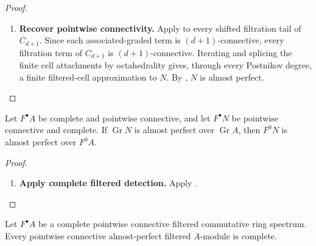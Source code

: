 \begin{proof}
\begin{enumerate}[label=\textup{(\arabic*)}]
\[        F^{w_i}C_d
        \longrightarrow
        \operatorname{Gr}^{w_i}C_d
    \]
    and pointwise \(d\)-connectivity give a surjection on \(\pi_d\). Choose lifts
    of the selected generators. They assemble to a morphism
    \[
        \bigoplus_{i=1}^r
        F^\bullet A\langle w_i\rangle[d]
        \longrightarrow
        C_d.
    \]
    Let \(C_{d+1}\) be its cofibre. Associated graded is exact, so the chosen
    classes kill the first possible homotopy group and
    \(\operatorname{Gr}C_{d+1}\) is \((d+1)\)-connective. It remains almost
    perfect. The source is a finite filtered cell and is complete; hence
    \(C_{d+1}\) is complete.
    \item \textbf{Recover pointwise connectivity.}
    Apply  to every shifted filtration tail
    of \(C_{d+1}\). Since each associated-graded term is
    \((d+1)\)-connective, every filtration term of \(C_{d+1}\) is
    \((d+1)\)-connective. Iterating and splicing the finite cell attachments by
    octahedrality gives, through every Postnikov degree, a finite filtered-cell
    approximation to \(N\). By , \(N\) is
    almost perfect.
\end{enumerate}
\end{proof}

\begin{corollary}
\label{lem:almost-perfect-complete-positive-filtration}
Let \(F^\bullet A\) be complete and pointwise connective, and let
\(F^\bullet N\) be pointwise connective and complete. If \(\operatorname{Gr}N\) is almost perfect over
\(\operatorname{Gr}A\), then \(F^0N\) is almost perfect over \(F^0A\).
\end{corollary}

\begin{proof}
\leavevmode
\begin{enumerate}[label=\textup{(\arabic*)}]
    \item \textbf{Apply complete filtered detection.}
    Apply .
\end{enumerate}
\end{proof}

\begin{corollary}
\label{lem:almost-perfect-filtered-complete}
Let \(F^\bullet A\) be a complete pointwise connective filtered commutative
ring spectrum. Every pointwise connective almost-perfect filtered
\(A\)-module is complete.
\end{corollary}


